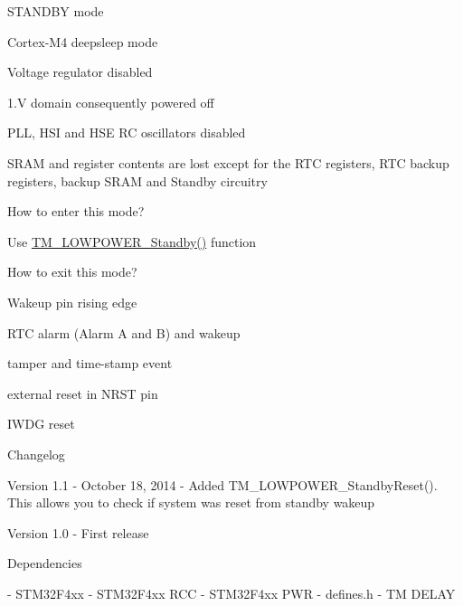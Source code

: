 \begin{DoxyParagraph}{S\+T\+A\+N\+D\+B\+Y mode}

\end{DoxyParagraph}

\begin{DoxyItemize}
\item Cortex-\/\+M4 deepsleep mode
\item Voltage regulator disabled
\item 1.\+V domain consequently powered off
\item P\+L\+L, H\+S\+I and H\+S\+E R\+C oscillators disabled
\item S\+R\+A\+M and register contents are lost except for the R\+T\+C registers, R\+T\+C backup registers, backup S\+R\+A\+M and Standby circuitry
\item How to enter this mode?
\begin{DoxyItemize}
\item Use \hyperlink{group___t_m___l_o_w_p_o_w_e_r___functions_ga80d88be15aa15b16681fa46cc49d25e2}{T\+M\+\_\+\+L\+O\+W\+P\+O\+W\+E\+R\+\_\+\+Standby()} function
\end{DoxyItemize}
\item How to exit this mode?
\begin{DoxyItemize}
\item Wakeup pin rising edge
\item R\+T\+C alarm (Alarm A and B) and wakeup
\item tamper and time-\/stamp event
\item external reset in N\+R\+S\+T pin
\item I\+W\+D\+G reset
\end{DoxyItemize}
\end{DoxyItemize}

\begin{DoxyParagraph}{Changelog}

\end{DoxyParagraph}
\begin{DoxyVerb} Version 1.1
   - October 18, 2014
   - Added TM_LOWPOWER_StandbyReset(). This allows you to check if system was reset from standby wakeup

 Version 1.0
   - First release
\end{DoxyVerb}


\begin{DoxyParagraph}{Dependencies}

\end{DoxyParagraph}
\begin{DoxyVerb} - STM32F4xx
 - STM32F4xx RCC
 - STM32F4xx PWR
 - defines.h
 - TM DELAY
\end{DoxyVerb}
 